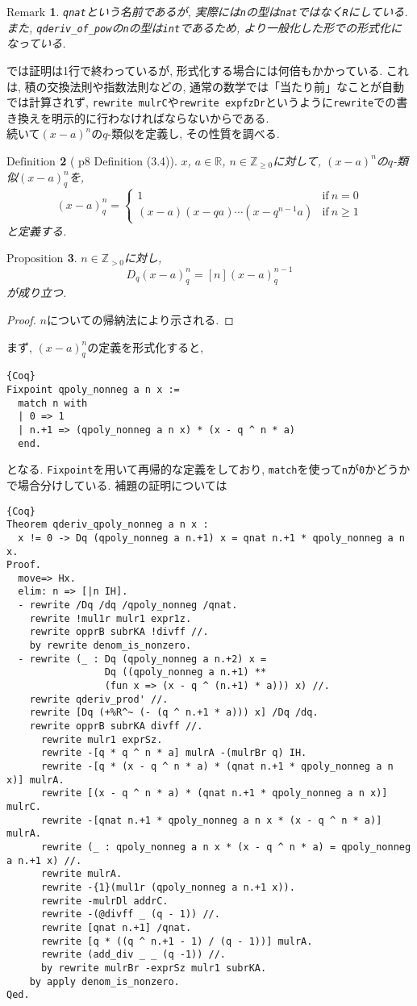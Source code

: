 \documentclass[11pt]{jarticle}
\theoremstyle{mystyle}
\newtheorem{df}{$\textrm{Definition}$}[subsection]
\newtheorem{prop}[df]{$\textrm{Proposition}$}
\newtheorem{rmk}[df]{$\textrm{Remark}$}
\newcommand{\bdf}{\begin{shadebox} \begin{df}}
\newcommand{\edf}{\end{df} \end{shadebox}}
\newcommand{\bprop}{\begin{shadebox} \begin{prop}}
\newcommand{\eprop}{\end{prop} \end{shadebox}}
\newcommand{\brmk}{\begin{rmk}}
\newcommand{\ermk}{\end{rmk}}
\newcommand{\bpf}{\begin{proof}}
\newcommand{\epf}{\end{proof}}
\newcommand{\Z}{\mathbb{Z}}
\newcommand{\R}{\mathbb{R}}
\newcommand{\0}{\textbf{0}}
\newcommand{\1}{\textbf{1}}
\newcommand{\2}{\textbf{2}}
\begin{document}
\brmk
  {\tt qnat}という名前であるが, 実際には{\tt n}の型は{\tt nat}ではなく{\tt R}にしている. 
  また, {\tt qderiv\_of\_pow}の{\tt n}の型は{\tt int}であるため, より一般化した形での形式化に
  なっている. 
\ermk
\cite{Kac}では証明は1行で終わっているが, 形式化する場合には何倍もかかっている. これは, 積の交換法則や指数法則などの, 通常の数学では「当たり前」なことが自動では計算されず, {\tt rewrite mulrC}や{\tt rewrite expfzDr}というように{\tt rewrite}での書き換えを明示的に行わなければならないからである. \\
続いて$(x - a)^n$の$q$-類似を定義し, その性質を調べる.  
\bdf[\cite{Kac} p8 Definition (3.4)]
  $x$, $a \in \R$, $n \in \Z_{\ge 0}$に対して, $(x - a)^n$の$q$-類似$(x - a)^n_q$を, 
  \[
  (x - a)^n_q = \begin{cases}
                      1 & \text{if}\ n = 0 \\
                      (x - a) (x - qa) \cdots (x - q^{n - 1} a) & \text{if}\ n \ge 1
                    \end{cases}
  \]
  と定義する. 
\edf
\bprop \label{q_deriv_qpoly_nonneg}
  $n\in\Z_{>0}$に対し, 
  \[
    D_q(x-a)^n_q = [n](x-a)^{n-1}_q
  \]
  が成り立つ. 
\eprop
\bpf
  $n$についての帰納法により示される. 
\epf
まず, $(x - a)^n_q$の定義を形式化すると, 
\begin{lstlisting}{Coq}
Fixpoint qpoly_nonneg a n x :=
  match n with
  | 0 => 1
  | n.+1 => (qpoly_nonneg a n x) * (x - q ^ n * a)
  end.
\end{lstlisting}
となる. {\tt Fixpoint}を用いて再帰的な定義をしており, {\tt match}を使って{\tt n}が{\tt 0}かどうかで場合分けしている. 補題の証明については 
\begin{lstlisting}{Coq}
Theorem qderiv_qpoly_nonneg a n x :
  x != 0 -> Dq (qpoly_nonneg a n.+1) x = qnat n.+1 * qpoly_nonneg a n x.
Proof.
  move=> Hx.
  elim: n => [|n IH].
  - rewrite /Dq /dq /qpoly_nonneg /qnat.
    rewrite !mul1r mulr1 expr1z.
    rewrite opprB subrKA !divff //.
    by rewrite denom_is_nonzero.
  - rewrite (_ : Dq (qpoly_nonneg a n.+2) x =
                 Dq ((qpoly_nonneg a n.+1) **
                 (fun x => (x - q ^ (n.+1) * a))) x) //.
    rewrite qderiv_prod' //.
    rewrite [Dq (+%R^~ (- (q ^ n.+1 * a))) x] /Dq /dq.
    rewrite opprB subrKA divff //.
      rewrite mulr1 exprSz.
      rewrite -[q * q ^ n * a] mulrA -(mulrBr q) IH.
      rewrite -[q * (x - q ^ n * a) * (qnat n.+1 * qpoly_nonneg a n x)] mulrA.
      rewrite [(x - q ^ n * a) * (qnat n.+1 * qpoly_nonneg a n x)] mulrC.
      rewrite -[qnat n.+1 * qpoly_nonneg a n x * (x - q ^ n * a)] mulrA.
      rewrite (_ : qpoly_nonneg a n x * (x - q ^ n * a) = qpoly_nonneg a n.+1 x) //.
      rewrite mulrA.
      rewrite -{1}(mul1r (qpoly_nonneg a n.+1 x)).
      rewrite -mulrDl addrC.
      rewrite -(@divff _ (q - 1)) //.
      rewrite [qnat n.+1] /qnat.
      rewrite [q * ((q ^ n.+1 - 1) / (q - 1))] mulrA.
      rewrite (add_div _ _ (q -1)) //.
      by rewrite mulrBr -exprSz mulr1 subrKA.
    by apply denom_is_nonzero.
Qed.
\end{lstlisting}
\end{document}
